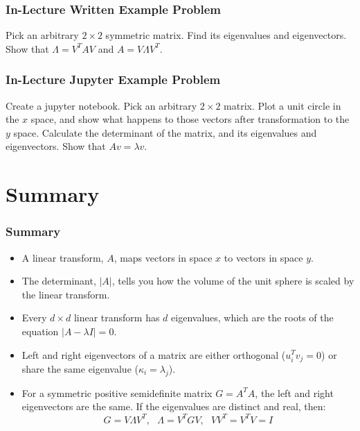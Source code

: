 \documentclass{beamer}
\begin{document}
\begin{frame}
  \frametitle{In-Lecture Written Example Problem}
  
  Pick an arbitrary $2\times 2$ symmetric matrix.  Find its
  eigenvalues and eigenvectors.  Show that $\Lambda=V^TAV$ and
  $A=V\Lambda V^T$.
\end{frame}
  
\begin{frame}
  \frametitle{In-Lecture Jupyter Example Problem}
  
  Create a jupyter notebook.  Pick an arbitrary $2\times 2$ matrix.
  Plot a unit circle in the ${x}$ space, and show what happens to
  those vectors after transformation to the ${y}$ space.
  Calculate the determinant of the matrix, and its eigenvalues and
  eigenvectors.  Show that $A{v}=\lambda{v}$.
  
\end{frame}
  
\section{Summary}
\setcounter{subsection}{1}

\begin{frame}
  \frametitle{Summary}
  \begin{itemize}
  \item A linear transform, $A$, maps vectors in space ${x}$ to vectors in space ${y}$.
  \item The determinant, $|A|$, tells you how the volume of the unit
    sphere is scaled by the linear transform.
  \item Every $d\times d$ linear transform has $d$ eigenvalues, which
    are the roots of the equation $|A-\lambda I|=0$.
  \item Left and right eigenvectors of a matrix are either orthogonal
    (${u}_i^T{v}_j=0$) or share the same eigenvalue ($\kappa_i=\lambda_j$).
  \item For a symmetric positive semidefinite matrix $G =A^TA$,
    the left and right eigenvectors are the same.  If the eigenvalues
    are distinct and real, then:
    \[
    G=V\Lambda V^T,~~~\Lambda = V^TG V,~~~VV^T=V^TV=I
    \]
  \end{itemize}
\end{frame}
\end{document}
